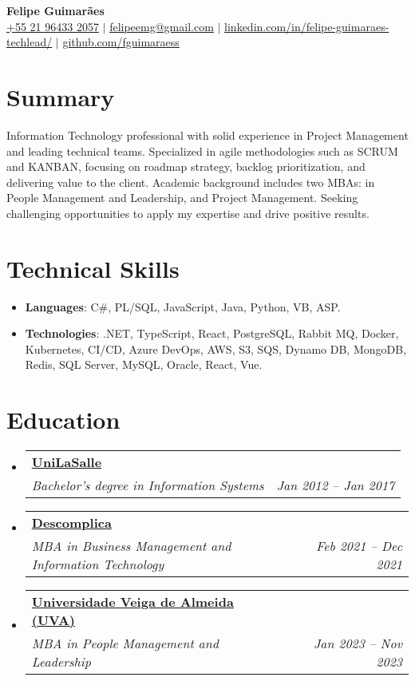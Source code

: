 \documentclass[letterpaper,10pt]{article}
\makeatletter
\newcommand{\resumeItem}[1]{\item\small{#1}}
\newcommand{\resumeSubheading}[4]{
\vspace{-1pt}\item
  \begin{tabular*}{0.97\textwidth}[t]{l@{\extracolsep{\fill}}r}
    \textbf{#1} & #2 \\
    \textit{#3} & \textit{#4} \\
  \end{tabular*}\vspace{-7pt}
}
\newcommand{\resumeSubHeadingList}{\begin{itemize}[leftmargin=0.15in, label={}]}
\newcommand{\resumeSubHeadingListEnd}{\end{itemize}}
\makeatother
\begin{document}
\begin{center}
  \textbf{\Huge Felipe Guimarães} \\
  \small 
  \href{tel:+5521964332057}{+55 21 96433 2057} $|$ 
  \href{mailto:felipeemg@gmail.com}{felipeemg@gmail.com} $|$ 
  \href{https://linkedin.com/in/felipe-guimaraes-techlead}{linkedin.com/in/felipe-guimaraes-techlead/} $|$
  \href{https://github.com/fguimaraess}{github.com/fguimaraess}
\end{center}

\section*{Summary}
Information Technology professional with solid experience in Project Management and leading technical teams. Specialized in agile methodologies such as SCRUM and KANBAN, focusing on roadmap strategy, backlog prioritization, and delivering value to the client. Academic background includes two MBAs: in People Management and Leadership, and Project Management. Seeking challenging opportunities to apply my expertise and drive positive results. 

\section{Technical Skills}
\resumeSubHeadingList
  \resumeItem{\textbf{Languages}: C\#, PL/SQL, JavaScript, Java, Python, VB, ASP.}
  \resumeItem{\textbf{Technologies}: .NET, TypeScript, React, PostgreSQL, Rabbit MQ, Docker, Kubernetes, CI/CD, Azure DevOps, AWS, S3, SQS, Dynamo DB, MongoDB, Redis, SQL Server, MySQL, Oracle, React, Vue.}
\resumeSubHeadingListEnd

\section{Education}
\resumeSubHeadingList
  \resumeSubheading
      {\href{https://www.unilasalle.edu.br/vestibular/rj}{UniLaSalle}}{}
      {Bachelor's degree in Information Systems}{Jan 2012 -- Jan 2017}
  \resumeSubheading
      {\href{https://descomplica.com.br/pos-graduacao/}{Descomplica}}{}
      {MBA in Business Management and Information Technology}{Feb 2021 -- Dec 2021}
  \resumeSubheading
      {\href{https://online.uva.br/}{Universidade Veiga de Almeida (UVA)}}{}
      {MBA in People Management and Leadership}{Jan 2023 -- Nov 2023}      
\resumeSubHeadingListEnd
\end{document}
